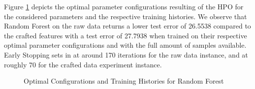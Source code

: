 Figure \ref{fig:RF_Optimal} depicts the optimal parameter configurations resulting of the HPO for the considered parameters and the respective training histories. We observe that Random Forest on the raw data returns a lower test error of 26.5538 compared to the crafted features with a test error of 27.7938 when trained on their respective optimal parameter configurations and with the full amount of samples available. Early Stopping sets in at around 170 iterations for the raw data instance, and at roughly 70 for the crafted data experiment instance. 
\begin{figure}[h]
	\centering
	\caption{Optimal Configurations and Training Histories for Random Forest}
	\label{fig:RF_Optimal}
\end{figure}

